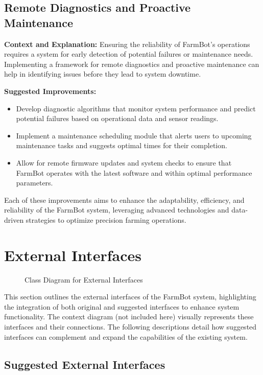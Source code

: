 \subsection{Remote Diagnostics and Proactive Maintenance}
\textbf{Context and Explanation:} Ensuring the reliability of FarmBot's operations requires a system for early detection of potential failures or maintenance needs. Implementing a framework for remote diagnostics and proactive maintenance can help in identifying issues before they lead to system downtime.

\textbf{Suggested Improvements:}
\begin{itemize}
    \item Develop diagnostic algorithms that monitor system performance and predict potential failures based on operational data and sensor readings.
    \item Implement a maintenance scheduling module that alerts users to upcoming maintenance tasks and suggests optimal times for their completion.
    \item Allow for remote firmware updates and system checks to ensure that FarmBot operates with the latest software and within optimal performance parameters.
\end{itemize}

Each of these improvements aims to enhance the adaptability, efficiency, and reliability of the FarmBot system, leveraging advanced technologies and data-driven strategies to optimize precision farming operations.


\section{External Interfaces}

\begin{figure}[H]
    \centering

\caption{Class Diagram for External Interfaces}
\end{figure}


This section outlines the external interfaces of the FarmBot system, highlighting the integration of both original and suggested interfaces to enhance system functionality. The context diagram (not included here) visually represents these interfaces and their connections. The following descriptions detail how suggested interfaces can complement and expand the capabilities of the existing system.

\subsection{Suggested External Interfaces}

